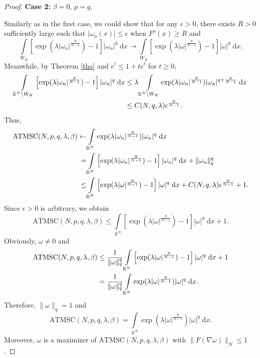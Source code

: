 \documentclass[11pt]{article}
\theoremstyle{plain}
\numberwithin{equation}{section}
\newcommand{\R}{\mathbb{R}}
\begin{document}
\begin{proof}
{\bfseries Case 2:} $\beta=0$, $p=q$.

Similarly as in the first case, we could show that for any $\epsilon>0$, there exists $R>0$ sufficiently large such that $\lvert\omega_{n}(x)\rvert\leq\epsilon$ when $F^{o}(x)\geq R$ and
$$
\int\limits_{W_{R}}\left[\exp(\lambda\lvert \omega_{n}\rvert^{\frac{N}{N-1}})-1\right]\lvert \omega_{n}\rvert^{q}\;\mathrm{d}x\rightarrow\int\limits_{W_{R}}\left[\exp(\lambda\lvert \omega\rvert^{\frac{N}{N-1}})-1\right]\lvert \omega\rvert^{q}\;\mathrm{d}x.
$$
Meanwhile, by Theorem \ref{tha} and $e^{t}\leq1+te^{t}$ for $t\geq0$,
\begin{align}
    \int\limits_{\R^{N}\backslash W_{R}}\left[\exp(\lambda\lvert \omega_{n}\rvert^{\frac{N}{N-1}})-1\right]\lvert \omega_{n}\rvert^{q}\;\mathrm{d}x&\leq\lambda\int\limits_{\R^{N}\backslash W_{R}}\exp(\lambda\lvert \omega_{n}\rvert^{\frac{N}{N-1}})\lvert \omega_{n}\rvert^{q+\frac{N}{N-1}}\;\mathrm{d}x\notag\\
    &\leq C(N,q,\lambda)\epsilon^{\frac{N}{N-1}}.\notag
\end{align}
Thus,
\begin{align}
    \mathrm{ATMSC}(N,p,q,\lambda,\beta)\leftarrow&\int\limits_{\R^{N}}\exp(\lambda\lvert \omega_{n}\rvert^{\frac{N}{N-1}})\lvert \omega_{n}\rvert^{q}\;\mathrm{d}x\notag\\
    =&\int\limits_{\R^{N}}\left[\exp(\lambda\lvert \omega_{n}\rvert^{\frac{N}{N-1}})-1\right]\lvert \omega_{n}\rvert^{q}\;\mathrm{d}x+\|\omega_{n}\|_{q}^{q}\notag\\
    \leq&\int\limits_{\R^{N}}\left[\exp(\lambda\lvert \omega\rvert^{\frac{N}{N-1}})-1\right]\lvert \omega\rvert^{q}\;\mathrm{d}x+C(N,q,\lambda)\epsilon^{\frac{N}{N-1}}+1.\notag
\end{align}
Since $\epsilon>0$ is arbitrary, we obtain
$$
\mathrm{ATMSC}(N,p,q,\lambda,\beta)\leq\int\limits_{\R^{N}}\left[\exp(\lambda\lvert \omega\rvert^{\frac{N}{N-1}})-1\right]\lvert \omega\rvert^{q}\;\mathrm{d}x+1.
$$
Obviously, $\omega\not=0$ and
\begin{align}
    \mathrm{ATMSC}(N,p,q,\lambda,\beta)&\leq\frac{1}{\|\omega\|_{q}^{q}}\int\limits_{\R^{N}}\left[\exp(\lambda\lvert \omega\rvert^{\frac{N}{N-1}})-1\right]\lvert \omega\rvert^{q}\;\mathrm{d}x+1\notag\\
    &=\frac{1}{\|\omega\|_{q}^{q}}\int\limits_{\R^{N}}\exp(\lambda\lvert \omega\rvert^{\frac{N}{N-1}})\lvert \omega\rvert^{q}\;\mathrm{d}x.\notag
\end{align}
Therefore, $\|\omega\|_{q}=1$ and
$$
\mathrm{ATMSC}(N,p,q,\lambda,\beta)=\int\limits_{\R^{N}}\exp(\lambda\lvert \omega\rvert^{\frac{N}{N-1}})\lvert \omega\rvert^{q}\;\mathrm{d}x.
$$
Moreover, $\omega$ is a maximizer of $\mathrm{ATMSC}(N,p,q,\lambda,\beta)$ with $\|F(\nabla\omega)\|_{N}\leq1$.


\end{proof}
\end{document}
